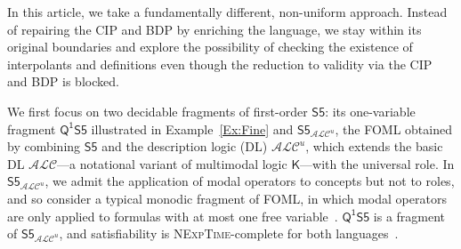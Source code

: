 \documentclass{lmcs} %
\theoremstyle{plain}\newtheorem{satz}[thm]{Satz} %
\newcommand{\nz}[1]{\textcolor{blue}{\bf!}%
	\marginpar[\parbox{15mm}{\raggedleft\scriptsize\textcolor{blue}{#1}}]%
	{\parbox{15mm}{\raggedright\scriptsize\textcolor{blue}{#1}}}}
\newcommand{\SF}{\ensuremath{\mathsf{S5}}}
\newcommand{\K}{\ensuremath{\mathsf{K}}}
\newcommand{\FOMS}{\ensuremath{\mathsf{Q^1S5}}}
\newcommand{\ALCIOS}{\ensuremath{\mathsf{S5}_{\mathcal{ALC}^u}}}
\begin{document}
In this article, we take a fundamentally different, non-uniform  approach. Instead of repairing the CIP and BDP by enriching the language, we stay within its original boundaries and explore the possibility of checking the existence of interpolants and definitions even though the reduction to validity via the CIP and BDP is blocked. 


We first focus on two decidable fragments of first-order \SF: its one-variable fragment \FOMS{} illustrated in Example~\ref{Ex:Fine} and 
\ALCIOS{}, the FOML obtained by combining \SF{} and the description logic (DL) $\mathcal{ALC}^{u}$, which extends  the basic DL $\mathcal{ALC}$---a notational variant of multimodal logic $\K$---with the universal role. In $\ALCIOS{}$, we admit the application of modal operators to concepts but not to roles, and so consider a typical monodic fragment of FOML, in which modal operators are only applied to formulas with at most one free variable~\cite{DBLP:journals/apal/HodkinsonWZ00,DBLP:journals/jsyml/WolterZ01}. \FOMS{} is a fragment of \ALCIOS{}, and satisfiability is \textsc{NExpTime}-complete for both languages~\cite{GabEtAl03}.  
\end{document}
